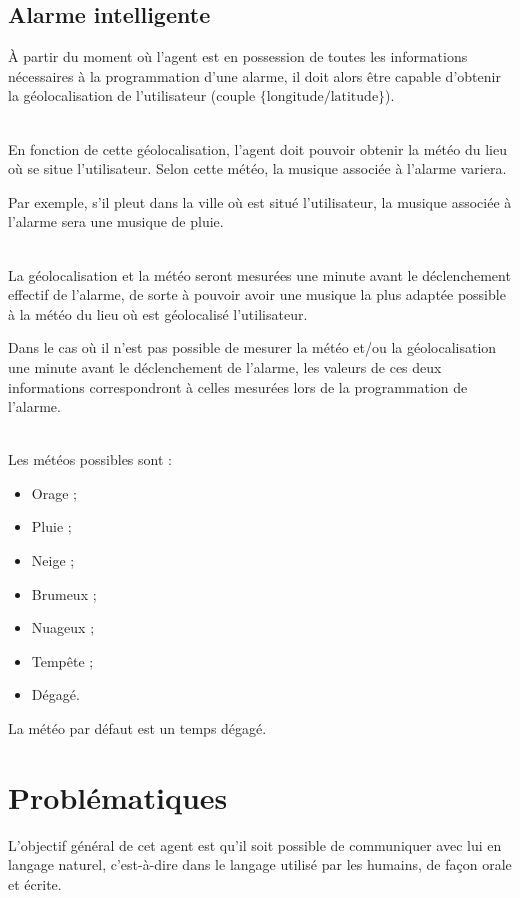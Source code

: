 \subsection{Alarme intelligente}
\`A partir du moment où l'agent est en possession de toutes les informations nécessaires à la programmation d'une alarme, il doit alors être capable d'obtenir la géolocalisation de l'utilisateur (couple $\{\text{longitude} / \text{latitude} \}$). 

~\\\indent 
En fonction de cette géolocalisation, l'agent doit pouvoir obtenir la météo du lieu où se situe l'utilisateur. Selon cette météo, la musique associée à l'alarme variera. 

Par exemple, s'il pleut dans la ville où est situé l'utilisateur, la musique associée à l'alarme sera une musique de pluie.

~\\\indent
La géolocalisation et la météo seront mesurées une minute avant le déclenchement effectif de l'alarme, de sorte à pouvoir avoir une musique la plus adaptée possible à la météo du lieu où est géolocalisé l'utilisateur.

Dans le cas où il n'est pas possible de mesurer la météo et/ou la géolocalisation une minute avant le déclenchement de l'alarme, les valeurs de ces deux informations correspondront à celles mesurées lors de la programmation de l'alarme.

~\\\indent
Les météos possibles sont : 
\begin{itemize}
    \item Orage ;
    \item Pluie ;
    \item Neige ;
    \item Brumeux ;
    \item Nuageux ;
    \item Tempête ;
    \item Dégagé.
\end{itemize}

La météo par défaut est un temps dégagé.


\section{Problématiques}
L'objectif général de cet agent est qu'il soit possible de communiquer avec lui en langage naturel, c'est-à-dire dans le langage utilisé par les humains, de façon orale et écrite. 

